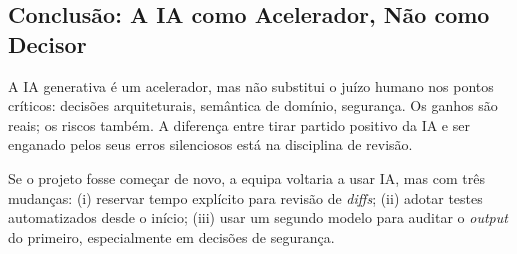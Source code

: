 \subsection{Conclusão: A IA como Acelerador, Não como Decisor}\label{subsec:ia_val_conclusao}

A IA generativa é um acelerador, mas não substitui o juízo humano nos pontos críticos: decisões arquiteturais, semântica de domínio, segurança. Os ganhos são reais; os riscos também. A diferença entre tirar partido positivo da IA e ser enganado pelos seus erros silenciosos está na disciplina de revisão.

Se o projeto fosse começar de novo, a equipa voltaria a usar IA, mas com três mudanças: (i) reservar tempo explícito para revisão de \textit{diffs}; (ii) adotar testes automatizados desde o início; (iii) usar um segundo modelo para auditar o \textit{output} do primeiro, especialmente em decisões de segurança.

